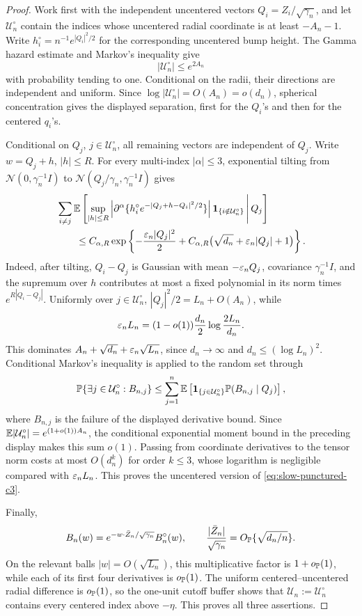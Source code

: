 \begin{proof}
Work first with the independent uncentered vectors
\(Q_i=Z_i/\sqrt{\gamma_n}\), and let \(\mathcal U_n^\circ\) contain the
indices whose uncentered radial coordinate is at least \(-A_n-1\).
Write \(h_i^\circ=n^{-1}e^{|Q_i|^2/2}\) for the corresponding uncentered
bump height.
The Gamma hazard estimate and Markov's inequality give
\[
 |\mathcal U_n^\circ|\le e^{2A_n}
\]
with probability tending to one. Conditional on the radii, their
directions are independent and uniform. Since
\(\log|\mathcal U_n^\circ|=O(A_n)=o(d_n)\), spherical concentration gives
the displayed separation, first for the \(Q_i\)'s and then for the
centered \(q_i\)'s.

Conditional on \(Q_j\), \(j\in\mathcal U_n^\circ\), all remaining vectors
are independent of \(Q_j\).  Write \(w=Q_j+h\), \(|h|\le R\).  For every
multi-index \(|\alpha|\le3\), exponential tilting from
\(\mathcal N(0,\gamma_n^{-1}I)\) to
\(\mathcal N(Q_j/\gamma_n,\gamma_n^{-1}I)\) gives
\begin{align*}
 &\sum_{i\ne j}\mathbb E\left[
  \sup_{|h|\le R}
  \left|\partial^\alpha
  \{h_i^\circ e^{-|Q_j+h-Q_i|^2/2}\}\right|
  \mathbf1_{\{i\notin\mathcal U_n^\circ\}}
  \,\middle|\,Q_j\right]\\
 &\qquad\le
 C_{\alpha,R}
 \exp\left\{
  -\frac{\varepsilon_n|Q_j|^2}{2}
  +C_{\alpha,R}\bigl(\sqrt{d_n}+\varepsilon_n|Q_j|+1\bigr)
 \right\}.
\end{align*}
Indeed, after tilting,
\(Q_i-Q_j\) is Gaussian with mean \(-\varepsilon_nQ_j\), covariance
\(\gamma_n^{-1}I\), and the supremum over \(h\) contributes at most a
fixed polynomial in its norm times \(e^{R|Q_i-Q_j|}\).
Uniformly over \(j\in\mathcal U_n^\circ\),
\(|Q_j|^2/2=L_n+O(A_n)\), while
\[
 \varepsilon_nL_n=(1-o(1))\frac{d_n}{2}\log\frac{2L_n}{d_n}.
\]
This dominates
\(A_n+\sqrt{d_n}+\varepsilon_n\sqrt{L_n}\), since
\(d_n\to\infty\) and \(d_n\le(\log L_n)^2\).  Conditional Markov's
inequality is applied to the random set through
\[
 \mathbb P\{\exists j\in\mathcal U_n^\circ:B_{n,j}\}
 \le
 \sum_{j=1}^n
 \mathbb E\left[
  \mathbf1_{\{j\in\mathcal U_n^\circ\}}
  \mathbb P(B_{n,j}\mid Q_j)
 \right],
\]
where \(B_{n,j}\) is the failure of the displayed derivative bound.
Since
\(\mathbb E|\mathcal U_n^\circ|=e^{(1+o(1))A_n}\), the conditional exponential
moment bound in the preceding display makes this sum \(o(1)\).  Passing from coordinate derivatives
to the tensor norm costs at most \(O(d_n^k)\) for order \(k\le3\), whose
logarithm is negligible compared with \(\varepsilon_nL_n\).  This proves the
uncentered version of \eqref{eq:slow-punctured-c3}.

Finally,
\[
 B_n(w)=e^{-w\cdot\bar Z_n/\sqrt{\gamma_n}}B_n^\circ(w),
 \qquad
 \frac{|\bar Z_n|}{\sqrt{\gamma_n}}
 =O_{\mathbb P}\{\sqrt{d_n/n}\}.
\]
On the relevant balls \(|w|=O(\sqrt{L_n})\), this multiplicative factor
is \(1+o_{\mathbb P}(1)\), while each of its first four derivatives is
\(o_{\mathbb P}(1)\).  The uniform
centered--uncentered radial difference is \(o_{\mathbb P}(1)\), so the
one-unit cutoff buffer shows that
\(\mathcal U_n:=\mathcal U_n^\circ\) contains every centered index above
\(-\eta\).  This proves all three assertions.
\end{proof}

